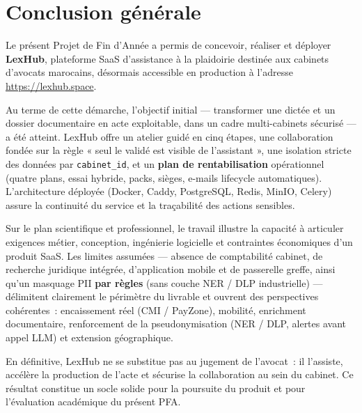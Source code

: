 \chapter{Conclusion générale}
\label{ch:conclusion}

Le présent Projet de Fin d'Année a permis de concevoir, réaliser et déployer \textbf{LexHub}, plateforme SaaS d'assistance à la plaidoirie destinée aux cabinets d'avocats marocains, désormais accessible en production à l'adresse \url{https://lexhub.space}.

Au terme de cette démarche, l'objectif initial --- transformer une dictée et un dossier documentaire en acte exploitable, dans un cadre multi-cabinets sécurisé --- a été atteint. LexHub offre un atelier guidé en cinq étapes, une collaboration fondée sur la règle « seul le validé est visible de l'assistant », une isolation stricte des données par \texttt{cabinet\_id}, et un \textbf{plan de rentabilisation} opérationnel (quatre plans, essai hybride, packs, sièges, e-mails lifecycle automatiques). L'architecture déployée (Docker, Caddy, PostgreSQL, Redis, MinIO, Celery) assure la continuité du service et la traçabilité des actions sensibles.

Sur le plan scientifique et professionnel, le travail illustre la capacité à articuler exigences métier, conception, ingénierie logicielle et contraintes économiques d'un produit SaaS. Les limites assumées --- absence de comptabilité cabinet, de recherche juridique intégrée, d'application mobile et de passerelle greffe, ainsi qu'un masquage PII \textbf{par règles} (sans couche NER / DLP industrielle) --- délimitent clairement le périmètre du livrable et ouvrent des perspectives cohérentes~: encaissement réel (CMI / PayZone), mobilité, enrichment documentaire, renforcement de la pseudonymisation (NER / DLP, alertes avant appel LLM) et extension géographique.

En définitive, LexHub ne se substitue pas au jugement de l'avocat~: il l'assiste, accélère la production de l'acte et sécurise la collaboration au sein du cabinet. Ce résultat constitue un socle solide pour la poursuite du produit et pour l'évaluation académique du présent PFA.
